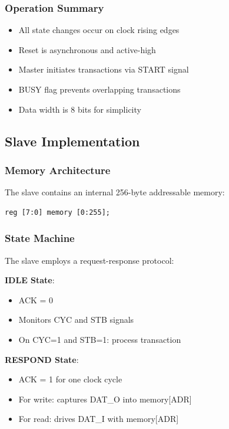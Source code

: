 \documentclass[12pt,a4paper]{article}
\begin{document}
\subsubsection{Operation Summary}
\begin{itemize}
    \item All state changes occur on clock rising edges
    \item Reset is asynchronous and active-high
    \item Master initiates transactions via START signal
    \item BUSY flag prevents overlapping transactions
    \item Data width is 8 bits for simplicity
\end{itemize}

\subsection{Slave Implementation}

\subsubsection{Memory Architecture}
The slave contains an internal 256-byte addressable memory:
\begin{lstlisting}[caption=Slave Memory Declaration]
reg [7:0] memory [0:255];
\end{lstlisting}

\subsubsection{State Machine}
The slave employs a request-response protocol:

\textbf{IDLE State}:
\begin{itemize}
    \item ACK = 0
    \item Monitors CYC and STB signals
    \item On CYC=1 and STB=1: process transaction
\end{itemize}

\textbf{RESPOND State}:
\begin{itemize}
    \item ACK = 1 for one clock cycle
    \item For write: captures DAT\_O into memory[ADR]
    \item For read: drives DAT\_I with memory[ADR]
\end{itemize}
\end{document}
